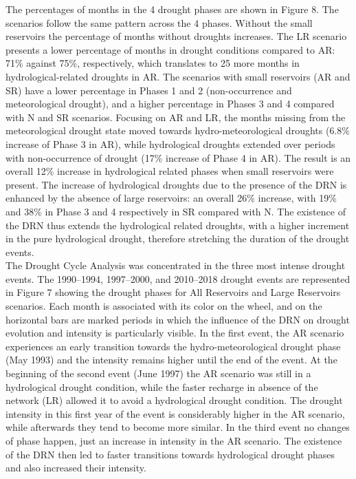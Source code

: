 \documentclass[draft]{agujournal2019}
\begin{document}

The percentages of months in the 4 drought phases are shown in Figure 8. The scenarios follow the same pattern across the 4 phases. Without the small reservoirs the percentage of months without droughts increases. The LR scenario presents a lower percentage of months in drought conditions compared to AR: 71\% against 75\%, respectively, which translates to 25 more months in hydrological-related droughts in AR. The scenarios with small reservoirs (AR and SR) have a lower percentage in Phases 1 and 2 (non-occurrence and meteorological drought), and a higher percentage in Phases 3 and 4 compared with N and SR scenarios. Focusing on AR and LR, the months missing from the meteorological drought state moved towards hydro-meteorological droughts (6.8\% increase of Phase 3 in AR), while hydrological droughts extended over periods with non-occurrence of drought (17\% increase of Phase 4 in AR). The result is an overall 12\% increase in hydrological related phases when small reservoirs were present. The increase of hydrological droughts due to the presence of the DRN is enhanced by the absence of large reservoirs: an overall 26\% increase, with 19\% and 38\% in Phase 3 and 4 respectively in SR compared with N. The existence of the DRN thus extends the hydrological related droughts, with a higher increment in the pure hydrological drought, therefore stretching the duration of the drought events.\\
The Drought Cycle Analysis was concentrated in the three most intense drought events. The 1990–1994, 1997–2000, and 2010–2018 drought events are represented in Figure 7 showing the  drought phases for All Reservoirs and Large Reservoirs scenarios. Each month is associated with its color on the wheel, and on the horizontal bars are marked periods in which the influence of the DRN on drought evolution and intensity is particularly visible. In the first event, the AR scenario experiences an early transition towards the hydro-meteorological drought phase (May 1993) and the intensity remains higher until the end of the event. At the beginning of the second event (June 1997) the AR scenario was still in a hydrological drought condition, while the faster recharge in absence of the network (LR) allowed it to avoid a hydrological drought condition. The drought intensity in this first year of the event is considerably higher in the AR scenario, while afterwards they tend to become more similar. In the third event no changes of phase happen, just an increase in intensity in the AR scenario. The existence of the DRN then led to faster transitions towards hydrological drought phases and also increased their intensity.
\end{document}
